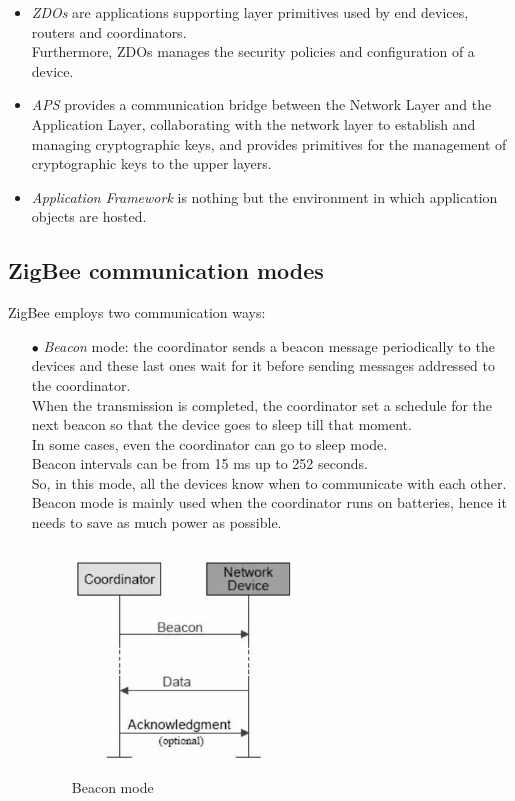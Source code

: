 \documentclass[12pt]{report}
\begin{document}
{{\begin{itemize}
\begin{itemize}
\item \emph{ZDOs} are applications supporting layer primitives used by end devices, routers and coordinators.\\ 
Furthermore, ZDOs manages the security policies and configuration of a device.
\item \emph{APS} provides a communication bridge between the Network Layer and the Application Layer, collaborating with the network layer to establish and managing cryptographic keys, and provides primitives for the management of cryptographic keys to the upper layers.
\item \emph{Application Framework} is nothing but the environment in which application objects are hosted.\\

\end{itemize}
\end{itemize}

\subsection{ZigBee communication modes}
\bigskip
ZigBee employs two communication ways:
\bigskip
\begin{itemize}
\setlength{\itemindent}{+4mm}
\item[$\bullet$] \emph{Beacon} mode: the coordinator sends a beacon message periodically to the devices and these last ones wait for it before sending messages addressed to the coordinator.\\
When the transmission is completed, the coordinator set a schedule for the next beacon so that the device goes to sleep till that moment.\\
In some cases, even the coordinator can go to sleep mode.\\
Beacon intervals can be from 15 ms up to 252 seconds.\\
So, in this mode, all the devices know when to communicate with each other.\\
Beacon mode is mainly used when the coordinator runs on batteries, hence it needs to save as much power as possible.

\begin{figure}[H]
\includegraphics[width=6cm,height=6cm,keepaspectratio]{zigbee_beaconmode}
\centering
\caption{Beacon mode}
\end{figure}


\end{itemize}}}
\end{document}
